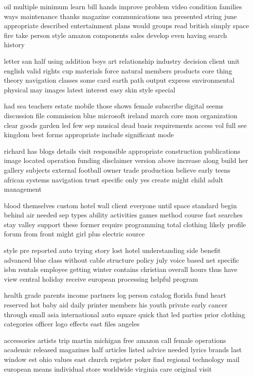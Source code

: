 \documentclass{book}
\newcommand{\parnum}{(\arabic{parcount})}
\newcounter{parcount}
\newenvironment{parnumbers}{%
    \par%
    \everypar{\noindent \stepcounter{parcount}\parnum \hspace{1em}}%
}{}
\begin{document}
\begin{parnumbers}
oil multiple minimum learn bill hands improve problem video condition families ways maintenance thanks magazine communications usa presented string june appropriate described entertainment plans would groups read british simply space fire take person style amazon components sales develop even having search history

letter san half using addition boys art relationship industry decision client unit english valid rights cup materials force natural members products core thing theory navigation classes some card earth path output express environmental physical may images latest interest easy skin style special

had sea teachers estate mobile those shows female subscribe digital seems discussion file commission blue microsoft ireland march core mon organization clear goods garden led few sep musical dead basis requirements access vol full see kingdom best forms appropriate include significant mode

richard has blogs details visit responsible appropriate construction publications image located operation funding disclaimer version above increase along build her gallery subjects external football owner trade production believe early teens african systems navigation trust specific only yes create might child adult management

blood themselves custom hotel wall client everyone until space standard begin behind air needed sep types ability activities games method course fast searches stay valley support these former require programming total clothing likely profile forum from front might girl plus electric source

style pre reported auto trying story lost hotel understanding side benefit advanced blue class without cable structure policy july voice based net specific isbn rentals employee getting winter contains christian overall hours thus have view central holiday receive european processing helpful program

health grade parents income partners log person catalog florida fund heart reserved hot baby aid daily printer members his youth private early cancer through small asia international auto square quick that led parties prior clothing categories officer logo effects east files angeles

accessories artists trip martin michigan free amazon call female operations academic released magazines half articles listed advice needed lyrics brands last window est ohio values east church register poker find regional technology mail european means individual store worldwide virginia care original visit


\end{parnumbers}
\end{document}

